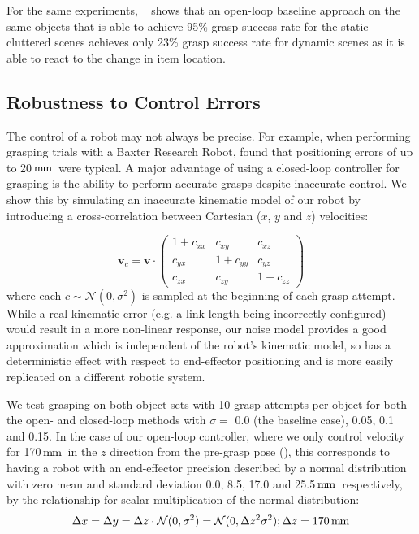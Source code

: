 \documentclass[conference]{IEEEtran}
\newcommand{\pack}	{\hspace{-0.08em}}
\newcommand{\mm}	{\ensuremath{\rm\,m\pack m}}
\begin{document}
For the same experiments, ~\cite{Viereck2017LearningImages} shows that an open-loop baseline approach on the same objects that is able to achieve 95\% grasp success rate for the static cluttered scenes achieves only 23\% grasp success rate for dynamic scenes as it is able to react to the change in item location. 





\subsection{Robustness to Control Errors}
\label{sec:controlerrors}

The control of a robot may not always be precise. For example, when performing grasping trials with a Baxter Research Robot, \citet{Lenz2015DeepGrasps} found that positioning errors of up to 20\mm~were typical.  A major advantage of using a closed-loop controller for grasping is the ability to perform accurate grasps despite inaccurate control.  We show this by simulating an inaccurate kinematic model of our robot by introducing a cross-correlation between Cartesian ($x$, $y$ and $z$) velocities:

\begin{equation*}
    \mathbf{v}_c = \mathbf{v} \cdot \begin{pmatrix} 1 + c_{xx} & c_{xy} & c_{xz} \\ c_{yx} & 1 + c_{yy} & c_{yz} \\ c_{zx} & c_{zy} & 1 + c_{zz} \end{pmatrix}
\end{equation*}
where each $c \sim \mathcal{N}(0, \sigma^{2})$ is sampled at the beginning of each grasp attempt.  While a real kinematic error (e.g. a link length being incorrectly configured) would result in a more non-linear response, our noise model provides a good approximation which is independent of the robot's kinematic model, so has a deterministic effect with respect to end-effector positioning and is more easily replicated on a different robotic system.  

We test grasping on both object sets with 10 grasp attempts per object for both the open- and closed-loop methods with $\sigma =$ 0.0 (the baseline case), 0.05, 0.1 and 0.15.  In the case of our open-loop controller, where we only control velocity for 170\mm~in the $z$ direction from the pre-grasp pose (), this corresponds to having a robot with an end-effector precision described by a normal distribution with zero mean and standard deviation 0.0, 8.5, 17.0 and 25.5\mm~respectively, by the relationship for scalar multiplication of the normal distribution:
\begin{equation*}
    \Delta x = \Delta y = \Delta z \cdot \mathcal{N}(0, \sigma^2) = \mathcal{N}(0, \Delta z^2 \sigma^2) ; \Delta z = \text{170\mm}
\end{equation*}
\end{document}
